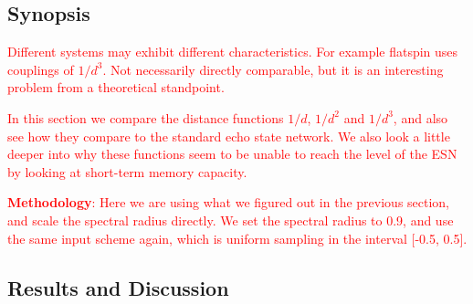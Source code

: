 \subsection{Synopsis}

\textcolor{red}{
  Different systems may exhibit different characteristics. For example flatspin
uses couplings of $1/d^3$. Not necessarily directly comparable, but it is an
interesting problem from a theoretical standpoint.
}

\textcolor{red}{
  In this section we compare the distance functions $1/d$, $1/d^2$ and $1/d^3$,
and also see how they compare to the standard echo state network. We also look a
little deeper into why these functions seem to be unable to reach the level of
the ESN by looking at short-term memory capacity.
}

\textcolor{red}{
  \textbf{Methodology}: Here we are using what we figured out in the previous
section, and scale the spectral radius directly. We set the spectral radius to
0.9, and use the same input scheme again, which is uniform sampling in the
interval [-0.5, 0.5].
}

\subsection{Results and Discussion}

